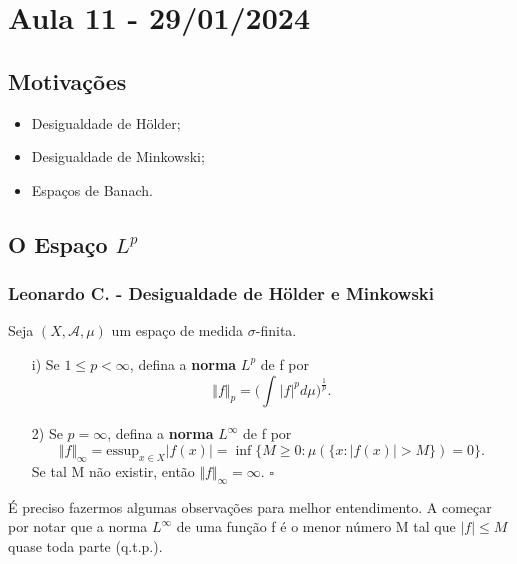 \documentclass[MeasureTheory/measure_theory.tex]{subfiles}
\begin{document}
\section{Aula 11 - 29/01/2024}
\subsection{Motivações}
\begin{itemize}
	\item Desigualdade de Hölder;
	\item Desigualdade de Minkowski;
	\item Espaços de Banach.
\end{itemize}
\subsection{O Espaço \(L^{p}\)}
\subsubsection*{Leonardo C. - Desigualdade de Hölder e Minkowski}
\begin{def*}
	Seja \((X, \mathcal{A}, \mu )\) um espaço de medida \(\sigma \)-finita.
	\begin{itemize}
		\item[i)] Se \(1\leq p<\infty\), defina a \textbf{norma }\(L^{p}\) de f por
		      \[
			      \Vert f \Vert_{p}=\biggl(\int_{}^{}|f|^{p}d\mu \biggr)^{\frac{1}{p}}.
		      \]
		\item[2)] Se \(p=\infty\), defina a \textbf{norma }\(L^{\infty}\) de f por
		      \[
			      \Vert f \Vert_{\infty}=\mathrm{essup}_{x\in X}|f(x)| = \inf_{}\{M\geq 0: \mu (\{x:|f(x)|>M\})=0\}.
		      \]
		      Se tal M não existir, então \(\Vert f \Vert_{\infty} = \infty.\) \(\square\)
	\end{itemize}
\end{def*}
É preciso fazermos algumas observações para melhor entendimento. A começar por notar que a norma \(L^{\infty}\) de uma função f é o menor número M tal que \(|f|\leq M\) quase toda parte (q.t.p.).
\end{document}

